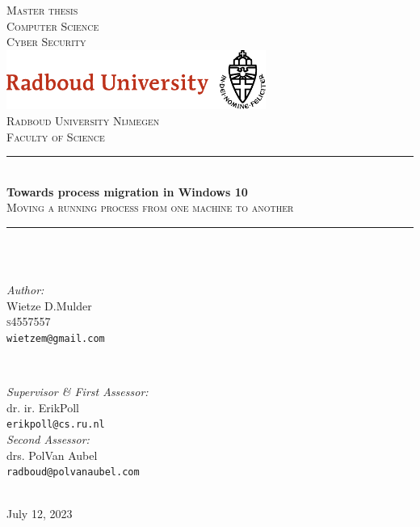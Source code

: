 \documentclass[a4paper, 11pt, english]{report}
\def\thesistitle{Towards process migration in Windows 10 }
\def\thesissubtitle{Moving a running process from one machine to another}
\def\thesisauthorfirst{Wietze D.}
\def\thesisauthorsecond{Mulder}
\def\thesissupervisorfirst{dr. ir. Erik}
\def\thesissupervisorsecond{Poll}
\def\thesissecondreaderfirst{drs. Pol}
\def\thesissecondreadersecond{Van Aubel}
\def\thesisdate{July 12, 2023}
\begin{document}
\begin{titlepage}
	\newcommand{\HRule}{\rule{\linewidth}{0.3mm}}
	\center
	\vspace*{0cm}
	\textsc{\Large Master thesis \\[0.2cm] Computer Science \\ Cyber Security}\\[1.0cm]
	\includegraphics[width=85mm]{images/logo-ru-compleet.pdf}\\[1.0cm] 
	\textsc{Radboud University Nijmegen \\ Faculty of Science}\\[0.5cm]
	
	\HRule \\[0.4cm]
	{ \Huge \bfseries \thesistitle} \\[0.1cm]
	\textsc{\thesissubtitle} \\
	\HRule \\[.5cm]
	\textsc{}\\[.5cm]
	
	\begin{minipage}[t]{0.42\textwidth}
		\begin{flushleft} \large
			\emph{Author:}\\
			\thesisauthorfirst\space \thesisauthorsecond \\
			\textsc{s4557557} \\
			\texttt{wietzem@gmail.com}
		\end{flushleft} 
	\end{minipage}
	~
	\begin{minipage}[t]{0.42\textwidth}
		\begin{flushright} \large
			\emph{Supervisor \& First Assessor:} \\
			\thesissupervisorfirst\space \thesissupervisorsecond \\%
			\texttt{erikpoll@cs.ru.nl}\\[2em]
			\emph{Second Assessor:} \\
			\thesissecondreaderfirst\space \thesissecondreadersecond \\
			\texttt{radboud@polvanaubel.com}
		\end{flushright}
	\end{minipage}\\[2.5cm]
	\vfill
	{\large \thesisdate}\\[2em]
	\clearpage
\end{titlepage}
\end{document}
